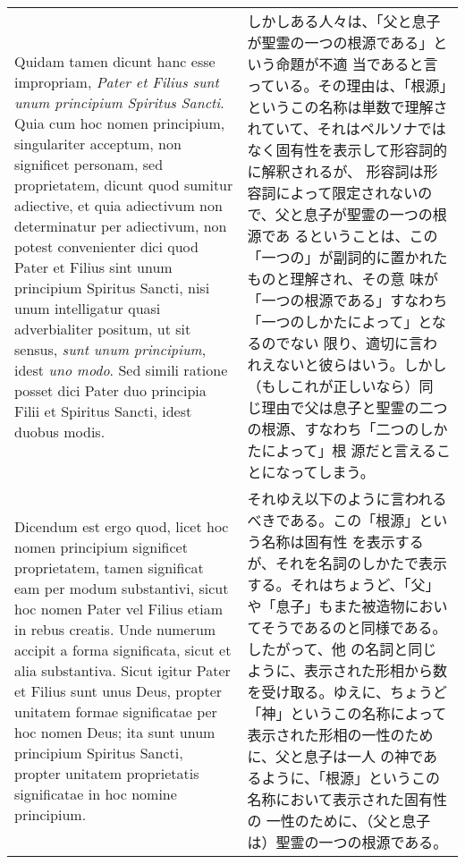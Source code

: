 \documentclass[10pt]{jsarticle} %
\begin{document}
\begin{longtable}{p{21em}p{21em}}
\\



Quidam tamen dicunt hanc esse impropriam, {\itshape Pater et Filius sunt
unum principium  Spiritus Sancti}. Quia cum hoc nomen principium,
singulariter acceptum, non significet personam, sed proprietatem,
dicunt quod sumitur adiective, et quia adiectivum non determinatur per
adiectivum, non potest convenienter dici quod Pater et Filius sint
unum principium Spiritus Sancti, nisi unum intelligatur quasi
adverbialiter positum, ut sit sensus, {\itshape sunt unum principium}, idest {\itshape uno
modo}. Sed simili ratione posset dici Pater duo principia Filii et
Spiritus Sancti, idest duobus modis. 


&

しかしある人々は、「父と息子が聖霊の一つの根源である」という命題が不適
当であると言っている。その理由は、「根源」というこの名称は単数で理解さ
れていて、それはペルソナではなく固有性を表示して形容詞的に解釈されるが、
形容詞は形容詞によって限定されないので、父と息子が聖霊の一つの根源であ
るということは、この「一つの」が副詞的に置かれたものと理解され、その意
味が「一つの根源である」すなわち「一つのしかたによって」となるのでない
限り、適切に言われえないと彼らはいう。しかし（もしこれが正しいなら）同
じ理由で父は息子と聖霊の二つの根源、すなわち「二つのしかたによって」根
源だと言えることになってしまう。

\\

Dicendum est ergo quod, licet hoc
nomen principium significet proprietatem, tamen significat eam per
modum substantivi, sicut hoc nomen Pater vel Filius etiam in rebus
creatis. 
Unde numerum accipit a forma significata, sicut et alia
substantiva. Sicut igitur Pater et Filius sunt unus Deus, propter
unitatem formae significatae per hoc nomen Deus; ita sunt unum
principium Spiritus Sancti, propter unitatem proprietatis
significatae in hoc nomine principium.

&

それゆえ以下のように言われるべきである。この「根源」という名称は固有性
を表示するが、それを名詞のしかたで表示する。それはちょうど、「父」
や「息子」もまた被造物においてそうであるのと同様である。したがって、他
の名詞と同じように、表示された形相から数を受け取る。ゆえに、ちょうど
「神」というこの名称によって表示された形相の一性のために、父と息子は一人
の神であるように、「根源」というこの名称において表示された固有性の
一性のために、（父と息子は）聖霊の一つの根源である。


\\




\end{longtable}
\end{document}
